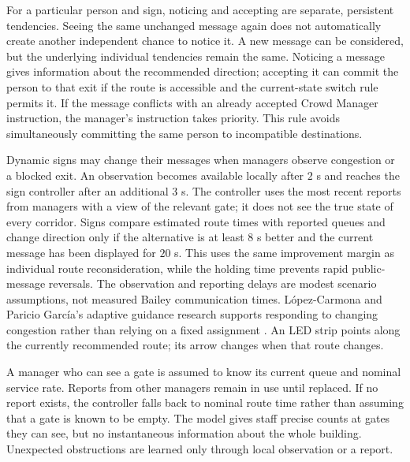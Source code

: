 \documentclass[11pt,a4paper]{article}
\begin{document}
For a particular person and sign, noticing and accepting are separate, persistent tendencies. Seeing the same unchanged message again does not automatically create another independent chance to notice it. A new message can be considered, but the underlying individual tendencies remain the same. Noticing a message gives information about the recommended direction; accepting it can commit the person to that exit if the route is accessible and the current-state switch rule permits it. If the message conflicts with an already accepted Crowd Manager instruction, the manager's instruction takes priority. This rule avoids simultaneously committing the same person to incompatible destinations.

Dynamic signs may change their messages when managers observe congestion or a blocked exit. An observation becomes available locally after $2$ s and reaches the sign controller after an additional $3$ s. The controller uses the most recent reports from managers with a view of the relevant gate; it does not see the true state of every corridor. Signs compare estimated route times with reported queues and change direction only if the alternative is at least $8$ s better and the current message has been displayed for $20$ s. This uses the same improvement margin as individual route reconsideration, while the holding time prevents rapid public-message reversals. The observation and reporting delays are modest scenario assumptions, not measured Bailey communication times. L\'opez-Carmona and Paricio Garc\'ia's adaptive guidance research supports responding to changing congestion rather than relying on a fixed assignment \cite{cellevac}. An LED strip points along the currently recommended route; its arrow changes when that route changes.

A manager who can see a gate is assumed to know its current queue and nominal service rate. Reports from other managers remain in use until replaced. If no report exists, the controller falls back to nominal route time rather than assuming that a gate is known to be empty. The model gives staff precise counts at gates they can see, but no instantaneous information about the whole building. Unexpected obstructions are learned only through local observation or a report.
\end{document}
